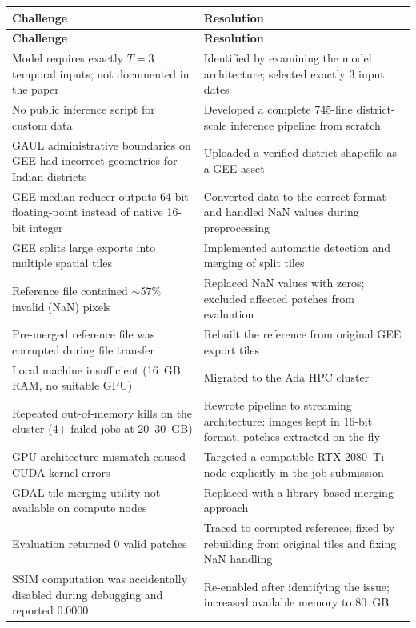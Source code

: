 \documentclass[12pt,a4paper]{article}
\begin{document}
\begin{longtable}{p{}p{}}
\toprule
\textbf{Challenge} & \textbf{Resolution} \\
\midrule
\endfirsthead
\toprule
\textbf{Challenge} & \textbf{Resolution} \\
\midrule
\endhead
\bottomrule
\endlastfoot

Model requires exactly $T=3$ temporal inputs; not documented in the paper & Identified by examining the model architecture; selected exactly 3 input dates \\
\midrule
No public inference script for custom data & Developed a complete 745-line district-scale inference pipeline from scratch \\
\midrule
GAUL administrative boundaries on GEE had incorrect geometries for Indian districts & Uploaded a verified district shapefile as a GEE asset \\
\midrule
GEE median reducer outputs 64-bit floating-point instead of native 16-bit integer & Converted data to the correct format and handled NaN values during preprocessing \\
\midrule
GEE splits large exports into multiple spatial tiles & Implemented automatic detection and merging of split tiles \\
\midrule
Reference file contained ${\sim}$57\% invalid (NaN) pixels & Replaced NaN values with zeros; excluded affected patches from evaluation \\
\midrule
Pre-merged reference file was corrupted during file transfer & Rebuilt the reference from original GEE export tiles \\
\midrule
Local machine insufficient (16~GB RAM, no suitable GPU) & Migrated to the Ada HPC cluster \\
\midrule
Repeated out-of-memory kills on the cluster (4+ failed jobs at 20--30~GB) & Rewrote pipeline to streaming architecture: images kept in 16-bit format, patches extracted on-the-fly \\
\midrule
GPU architecture mismatch caused CUDA kernel errors & Targeted a compatible RTX 2080~Ti node explicitly in the job submission \\
\midrule
GDAL tile-merging utility not available on compute nodes & Replaced with a library-based merging approach \\
\midrule
Evaluation returned 0 valid patches & Traced to corrupted reference; fixed by rebuilding from original tiles and fixing NaN handling \\
\midrule
SSIM computation was accidentally disabled during debugging and reported 0.0000 & Re-enabled after identifying the issue; increased available memory to 80~GB \\

\end{longtable}
\end{document}
